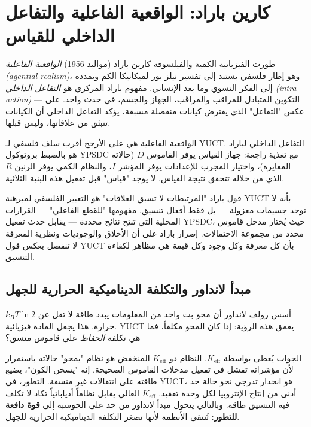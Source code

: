 \documentclass[12pt,a4paper]{article}
\newcommand{\Keff}{K_{\mathrm{eff}}}
\begin{document}
	\section{كارين باراد: الواقعية الفاعلية والتفاعل الداخلي للقياس}
	
	طورت الفيزيائية الكمية والفيلسوفة كارين باراد (مواليد 1956) \emph{الواقعية الفاعلية (agential realism)}، وهو إطار فلسفي يستند إلى تفسير نيلز بور لميكانيكا الكم ويمدده إلى الفكر النسوي وما بعد الإنساني. مفهوم باراد المركزي هو \emph{التفاعل الداخلي (intra-action)} — التكوين المتبادل للمراقب والمراقَب، الجهاز والجسم، في حدث واحد. على عكس "التفاعل" الذي يفترض كيانات منفصلة مسبقة، يؤكد التفاعل الداخلي أن الكيانات تنبثق من علاقاتها، وليس قبلها.
	
	الواقعية الفاعلية هي على الأرجح أقرب سلف فلسفي لـ YUCT. التفاعل الداخلي لباراد هو بالضبط بروتوكول YPSDC مع تغذية راجعة: جهاز القياس يوفر القاموس \(D\) (حالاته المعايرة)، واختيار المجرب للإعدادات يوفر المؤشر \(I\)، والنظام الكمي يوفر الرنين \(R\) الذي من خلاله تتحقق نتيجة القياس. لا يوجد "قياس" قبل تفعيل هذه البنية الثلاثية.
	
	قول باراد "المرتبطات لا تسبق العلاقات" هو التعبير الفلسفي لمبرهنة YUCT بأنه لا توجد جسيمات معزولة — بل فقط أفعال تنسيق. مفهومها "للقطع الفاعلي" — القرارات المحلية التي تنتج نتائج محددة — يقابل حدث تفعيل YPSDC، حيث يُختار مدخل قاموس محدد من مجموعة الاحتمالات. إصرار باراد على أن الأخلاق والوجوديات ونظرية المعرفة لا تنفصل يعكس قول YUCT بأن كل معرفة وكل وجود وكل قيمة هي مظاهر لكفاءة التنسيق.
	
	\subsection{مبدأ لانداور والتكلفة الديناميكية الحرارية للجهل}
	
	أسس رولف لانداور أن محو بت واحد من المعلومات يبدد طاقة لا تقل عن \(k_B T \ln 2\) حرارة. هذا يجعل المادة فيزيائية. YUCT يعمق هذه الرؤية: إذا كان المحو مكلفاً، فما هي تكلفة \emph{الحفاظ} على قاموس منسق؟
	
	الجواب يُعطى بواسطة \(\Keff\). النظام ذو \(\Keff\) المنخفض هو نظام "يمحو" حالاته باستمرار لأن مؤشراته تفشل في تفعيل مدخلات القاموس الصحيحة. إنه "يسخن الكون"، يضيع طاقته على انتقالات غير منسقة. التطور، في YUCT، هو انحدار تدرجي نحو حالة حد أدنى من إنتاج الإنتروبيا لكل وحدة تعقيد. \(\Keff\) العالي يقابل نظاماً أدياباتياً تكاد لا تكلف فيه التنسيق طاقة. وبالتالي يتحول مبدأ لانداور من حد على الحوسبة إلى \textbf{قوة دافعة للتطور}: تُنتقى الأنظمة لأنها تصغر التكلفة الديناميكية الحرارية للجهل.
	
\end{document}
